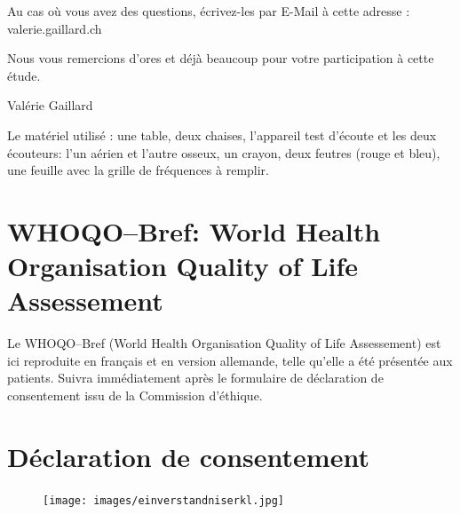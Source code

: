 Au cas où vous avez des questions, écrivez-les par E-Mail à cette adresse : valerie.gaillard\@gmx.ch

Nous vous remercions d'ores et déjà beaucoup pour votre participation
à cette étude.

Valérie Gaillard


\begin{french}
	Le matériel utilisé : une table, deux chaises, l'appareil
	test d'écoute et les deux écouteurs: l'un aérien et l'autre osseux, un crayon, deux
	feutres (rouge et bleu), une feuille avec la grille de fréquences à
	remplir.
\end{french}

\section{WHOQO--Bref: World Health
   Organisation Quality of Life Assessement}

Le WHOQO--Bref (World Health
   Organisation Quality of Life Assessement) est ici reproduite en
   français et en
   version allemande, telle qu'elle a été présentée aux patients.
Suivra immédiatement après le  formulaire de déclaration de  consentement issu de la Commission 
d'éthique.











\clearpage
\section{Déclaration de consentement}
\begin{figure}[bh]
	\centering
	\texttt{[image: images/einverstandniserkl.jpg]}
	\label{fig:déclaration de consentement}
\end{figure}

%
%
%
%
%
